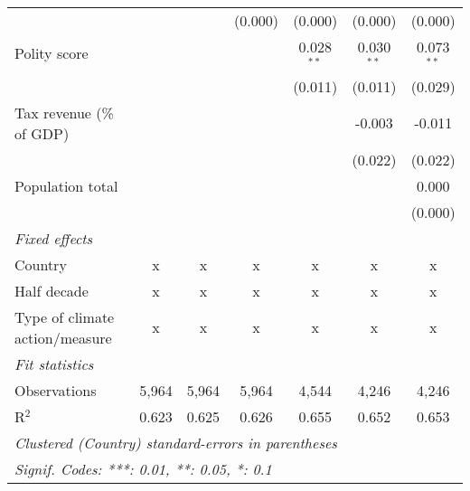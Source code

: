 \begin{tabular}{lcccccc}
                                                                         &              &               & (0.000)        & (0.000)        & (0.000)        & (0.000)\\   
   Polity score                                                          &              &               &                & 0.028$^{**}$   & 0.030$^{**}$   & 0.073$^{**}$\\   
                                                                         &              &               &                & (0.011)        & (0.011)        & (0.029)\\   
   Tax revenue (\% of GDP)                                               &              &               &                &                & -0.003         & -0.011\\   
                                                                         &              &               &                &                & (0.022)        & (0.022)\\   
   Population total                                                      &              &               &                &                &                & 0.000\\   
                                                                         &              &               &                &                &                & (0.000)\\   
   \emph{Fixed effects}\\
   Country                                                               & x            & x             & x              & x              & x              & x\\  
   Half decade                                                           & x            & x             & x              & x              & x              & x\\  
   Type of climate action/measure                                        & x            & x             & x              & x              & x              & x\\  
   \midrule \emph{Fit statistics}\\
   Observations                                                          & 5,964        & 5,964         & 5,964          & 4,544          & 4,246          & 4,246\\  
   R$^2$                                                                 & 0.623        & 0.625         & 0.626          & 0.655          & 0.652          & 0.653\\  
   \midrule
   \multicolumn{7}{l}{\emph{Clustered (Country) standard-errors in parentheses}}\\
   \multicolumn{7}{l}{\emph{Signif. Codes: ***: 0.01, **: 0.05, *: 0.1}}\\
\end{tabular}
\par\endgroup


